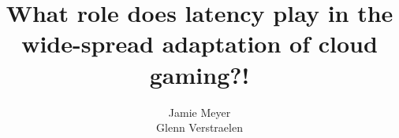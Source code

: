 \documentclass[]{report}
\title{What role does latency play in the wide-spread adaptation of cloud gaming?!}
\author{Jamie Meyer \\ Glenn Verstraelen}
\begin{document}
\maketitle

\begin{abstract}
\end{abstract}
\end{document}
